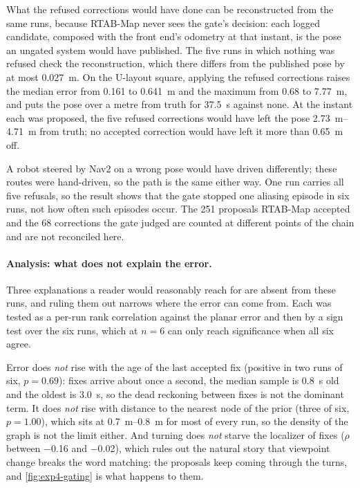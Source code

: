 \documentclass[11pt,a4paper,notitlepage]{report}
\begin{document}
What the refused corrections would have done can be reconstructed from the same
runs, because RTAB-Map never sees the gate's decision: each logged candidate,
composed with the front end's odometry at that instant, is the pose an ungated
system would have published. The
five runs in which nothing was refused check the reconstruction, which there
differs from the published pose by at most \SI{0.027}{\metre}. On the U-layout
square, applying the refused corrections raises the median error from
\SI{0.161}{} to \SI{0.641}{\metre} and the maximum from \SI{0.68}{} to
\SI{7.77}{\metre}, and puts the pose over a metre from truth for
\SI{37.5}{\second} against none. At the instant each was proposed, the five
refused corrections would have left the pose \SIrange{2.73}{4.71}{\metre} from
truth; no accepted correction would have left it more than
\SI{0.65}{\metre} off.

 A robot steered by Nav2 on a wrong pose would have driven differently; these routes were
hand-driven, so the path is the same either way. One run carries all five
refusals, so the result shows that the gate stopped one aliasing episode in six
runs, not how often such episodes occur. The \num{251} proposals RTAB-Map
accepted and the \num{68} corrections the gate judged are counted at different
points of the chain and are not reconciled here.

\paragraph{Analysis: what does not explain the error.} Three explanations a
reader would reasonably reach for are absent from these runs, and ruling them
out narrows where the error can come from. Each was tested as a per-run rank
correlation against the planar error and then by a sign test over the six runs,
which at $n=6$ can only reach significance when all six agree.

Error does \emph{not} rise with the age of the last accepted fix (positive in
two runs of six, $p = \num{0.69}$): fixes arrive about once a second, the
median sample is \SI{0.8}{\second} old and the oldest is \SI{3.0}{\second}, so
the dead reckoning between fixes is not the dominant term. It does \emph{not}
rise with distance to the nearest node of the prior (three of six,
$p = \num{1.00}$), which sits at \SIrange{0.7}{0.8}{\metre} for most of every
run, so the density of the graph is not the limit either. And turning does
\emph{not} starve the localizer of fixes ($\rho$ between \num{-0.16} and
\num{-0.02}), which rules out the natural story that viewpoint change breaks
the word matching: the proposals keep coming through the turns, and
\cref{fig:exp4-gating} is what happens to them.
\end{document}
